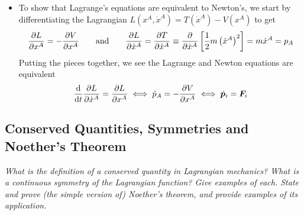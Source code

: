 \documentclass[11pt, a4paper]{article}
\newcommand{\eqtext}[1]{\qquad \text{#1} \qquad}
\newcommand{\bdot}[1]{\dot{\bm{#1}}}
\begin{document}
\begin{itemize}
	\item To show that Lagrange's equations are equivalent to Newton's, we start by differentiating the Lagrangian $ L(x^{A}, \dot{x}^{A}) = T(\dot{x}^{A}) - V(x^{A}) $ to get
	\begin{equation*}
		\pdv{L}{x^{A}} = - \pdv{V}{x^{A}} \eqtext{and} \pdv{L}{\dot{x}^{A}} = \pdv{T}{\dot{x}^{A}} \equiv \pdv{}{\dot{x}^{A}}\left[\frac{1}{2}m \left (\dot{x}^{A}\right )^{2}\right] = m\dot{x}^{A} = p_{A}
	\end{equation*}
	Putting the pieces together, we see the Lagrange and Newton equations are equivalent 
	\begin{equation*}
		\dv{}{t}\pdv{L}{\dot{x}^{A}} = \pdv{L}{x^{A}}  \iff \dot{p}_{A} = - \pdv{V}{x^{A}} \iff \bdot{p}_{i} = \bm{F}_{i}
	\end{equation*}
	
\end{itemize}



\subsection{Conserved Quantities, Symmetries and Noether's Theorem}
\textit{What is the definition of a conserved quantity in Lagrangian mechanics? What is a continuous symmetry of the Lagrangian function? Give examples of each. State and prove (the simple version of) Noether's theorem, and provide examples of its application.}
\end{document}

